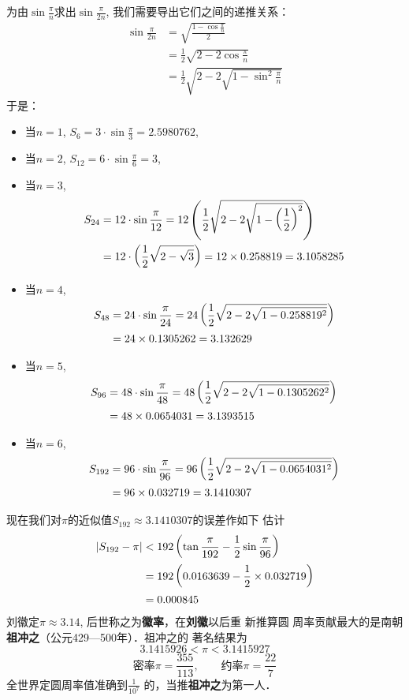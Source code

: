 为由$\sin\frac{\pi}{n}$求出$\sin\frac{\pi}{2n}$, 我们需要导出它们之间的递推关系：
\[\begin{split}
    \sin\frac{\pi}{2n}&=\sqrt{\frac{1-\cos\frac{\pi}{n}}{2}}\\
    &=\frac{1}{2}\sqrt{2-2\cos\frac{\pi}{n}}\\
    &=\frac{1}{2}\sqrt{2-2\sqrt{1-\sin^2\frac{\pi}{n}}}
\end{split}\]
于是：
\begin{itemize}
    \item 当$n=1$, $S_6=3\cdot \sin \frac{\pi}{3}=2.5980762$, 
    \item 当$n=2$, $S_{12}=6\cdot \sin \frac{\pi}{6}=3$,
    \item 当$n=3$, 
    \[\begin{split}
        S_{24}&=12\cdot \sin \dfrac{\pi}{12}=12\left(\dfrac{1}{2}\sqrt{2-2\sqrt{1-\left(\dfrac{1}{2}\right)^2}}\right)\\
        &=12\cdot \left(\dfrac{1}{2}\sqrt{2-\sqrt{3}}\right)=12\times 0.258819=3.1058285
    \end{split}\]
    \item 当$n=4$, 
    \[\begin{split}
        S_{48}&=24\cdot \sin \dfrac{\pi}{24}=24\left(\dfrac{1}{2}\sqrt{2-2\sqrt{1-0.258819^2}}\right)\\
        &=24\times 0.1305262=3.132629
    \end{split}\]
    \item 当$n=5$, 
    \[\begin{split}
        S_{96}&=48\cdot \sin \dfrac{\pi}{48}=48\left(\dfrac{1}{2}\sqrt{2-2\sqrt{1-0.1305262^2}}\right)\\
        &=48\times 0.0654031=3.1393515
    \end{split}\]
    \item 当$n=6$, 
    \[\begin{split}
        S_{192}&=96\cdot \sin \dfrac{\pi}{96}=96\left(\dfrac{1}{2}\sqrt{2-2\sqrt{1-0.0654031^2}}\right)\\
        &=96\times 0.032719=3.1410307
    \end{split}\]
\end{itemize}

现在我们对$\pi$的近似值$S_{192}\approx 3.1410307$的误差作如下
估计
\[\begin{split}
    |S_{192}-\pi|&<192\left(\tan\dfrac{\pi}{192}-\dfrac{1}{2}\sin\dfrac{\pi}{96}\right)\\
    &=192\left(0.0163639-\dfrac{1}{2}\times 0.032719\right)\\
    &=0.000845
\end{split}\]
刘徽定$\pi\approx 3.14$, 后世称之为\textbf{徽率}，在\textbf{刘徽}以后重 新推算圆
周率贡献最大的是南朝\textbf{祖冲之}（公元429—500年）．祖冲之的
著名结果为
\[3.1415926<\pi <3.1415927\]
\[\text{密率}\pi=\frac{355}{113},\qquad \text{约率}\pi=\frac{22}{7}\]
全世界定圆周率值准确到$\frac{1}{10^7}$
的，当推\textbf{祖冲之}为第一人．


